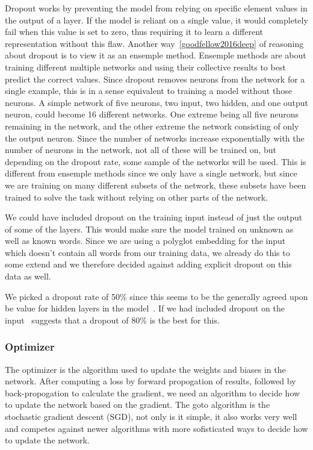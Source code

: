 Dropout works by preventing the model from relying on specific element values in
the output of a layer. If the model is reliant on a single value, it would
completely fail when this value is set to zero, thus requiring it to learn a
different representation without this flaw. Another way~\ref{goodfellow2016deep}
of reasoning about dropout is to view it as an ensemple method. Ensemple methods
are about training different multiple networks and using their collective
results to best predict the correct values. Since dropout removes neurons from
the network for a single example, this is in a sense equivalent to training a
model without those neurons. A simple network of five neurons, two input, two
hidden, and one output neuron, could become 16 different networks. One extreme
being all five neurons remaining in the network, and the other extreme the
network consisting of only the output neuron. Since the number of networks
increase exponentially with the number of neurons in the network, not all of
these will be trained on, but depending on the dropout rate, some sample of the
networks will be used. This is different from ensemple methods since we only
have a single network, but since we are training on many different subsets of
the network, these subsets have been trained to solve the task without relying
on other parts of the network. 

We could have included dropout on the training input instead of just the output
of some of the layers. This would make sure the model trained on unknown as well
as known words. Since we are using a polyglot embedding for the input which
doesn't contain all words from our training data, we already do this to some
extend and we therefore decided against adding explicit dropout on this data as
well.

We picked a dropout rate of 50\% since this seems to be the generally agreed
upon be value for hidden layers in the model~\cite{yang2018design}. If we had
included dropout on the input~\cite{goodfellow2016deep} suggests that a dropout
of 80\% is the best for this.


\subsubsection{Optimizer}

The optimizer is the algorithm used to update the weights and biases in the
network. After computing a loss by forward propogation of results, followed by
back-propogation to calculate the gradient, we need an algorithm to decide how
to update the network based on the gradient. The goto algorithm is the
stochastic gradient descent (SGD), not only is it simple, it also works very
well and competes against newer algorithms with more sofisticated ways to decide
how to update the network.

